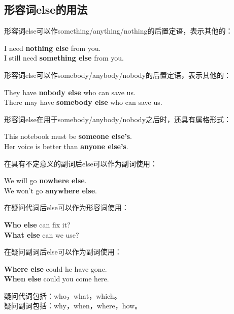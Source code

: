 \documentclass[UTF8]{ctexart}
\newcommand{\littf}[1]{{\hspace{3pt}\ttfamily #1}}
\begin{document}
\subsection{形容词\littf{else}的用法}
    形容词\littf{else}可以作\littf{something/anything/nothing}的后置定语，表示其他的：
    \begin{center}
        \large\ttfamily
        I need \textbf{nothing else} from you.\\[3mm]
        I still need \textbf{something else} from you.\\[6mm]
    \end{center}
    形容词\littf{else}可以作\littf{somebody/anybody/nobody}的后置定语，表示其他的：
    \begin{center}
        \large\ttfamily
        They have \textbf{nobody else} who can save us.\\[3mm] 
        There may have \textbf{somebody else} who can save us.\\[6mm]
    \end{center}
    形容词\littf{else}在用于\littf{somebody/anybody/nobody}之后时，还具有属格形式：
    \begin{center}
        \large\ttfamily
        This notebook must be \textbf{someone else's}.\\[3mm]
        Her voice is better than \textbf{anyone else's}.\\[6mm]
    \end{center}
    在具有不定意义的副词后\littf{else}可以作为副词使用：
    \begin{center}
        \large\ttfamily
        We will go \textbf{nowhere else}.\\[3mm]
        We won't go \textbf{anywhere else}.\\[6mm]
    \end{center}
    在疑问代词后\littf{else}可以作为形容词使用：
    \begin{center}
        \large\ttfamily
        \textbf{Who else} can fix it?\\[3mm]
        \textbf{What else} can we use?\\[6mm]
    \end{center}
    在疑问副词后\littf{else}可以作为副词使用：
    \begin{center}
        \large\ttfamily
        \textbf{Where else} could he have gone.\\[3mm]
        \textbf{When else} could you come here.\\[6mm]
    \end{center}
    疑问代词包括：\littf{who}，\littf{what}，\littf{which}。\\[3mm]
    疑问副词包括：\littf{why}，\littf{when}，\littf{where}，\littf{how}。\\[3mm]
\end{document}
